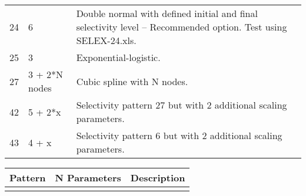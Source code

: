 \begin{center}
\begin{longtable}{p{2cm} p{3cm} p{10cm}}
		24 & 6 & Double normal with defined initial and final selectivity level – Recommended option.  Test using SELEX-24.xls. \\
		25 & 3 & Exponential-logistic. \\
		27 & 3 + 2*N nodes & Cubic spline with N nodes. \\
		42 & 5 + 2*x & Selectivity pattern 27 but with 2 additional scaling parameters. \\
		43 & 4 + x & Selectivity pattern 6 but with 2 additional scaling parameters.\\
		\hline
	\end{longtable}
\end{center}


\begin{center}
	\begin{longtable}{p{2cm} p{3cm} p{10cm}}

		\endfirsthead

		\hline
		Pattern & N Parameters & Description \\
		\hline
		\endhead

		\endfoot
		\endlastfoot


\end{longtable}
\end{center}
